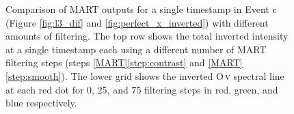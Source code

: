 \documentclass[linenumbers,trackchanges]{aastex63}
\begin{document}
\begin{figure}[htb!]
	\center
	\caption{Comparison of MART outputs for a single timestamp in Event c (Figure \ref{fig:l3_dif} and \ref{fig:perfect_x_inverted}) with different amounts of filtering. 
		The top row shows the total inverted intensity at a single timestamp each using a different number of MART filtering steps (steps \ref{MART}\ref{step:contrast} and \ref{MART}\ref{step:smooth}).  
		The lower grid shows the inverted O\,\textsc{v} spectral line at each red dot for 0, 25, and 75 filtering steps in red, green, and blue respectively.}
	\label{fig:perfect_x_invertcomp}
\end{figure}
\end{document}
